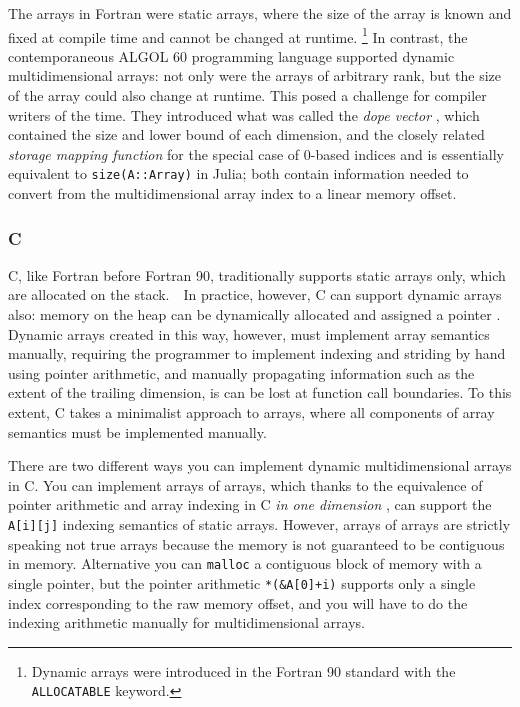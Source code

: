 \documentclass[preprint]{sigplanconf}
\newcommand{\ALGOL}{A\textsc{LGOL}}
\newcommand{\code}[1]{\texttt{#1}}
\begin{document}
The arrays in Fortran were static arrays, where the size of the array is known
and fixed at compile time and cannot be changed at runtime. \footnote{Dynamic
arrays were introduced in the Fortran 90 standard with the \code{ALLOCATABLE}
keyword.} In contrast, the contemporaneous \ALGOL{} 60 programming language
supported dynamic multidimensional arrays: not only were the arrays of
arbitrary rank, but the size of the array could also change at runtime. This
posed a challenge for compiler writers of the time. They introduced what was
called the \textit{dope vector} \cite{Sattley:1960as, Sattley:1961as}, which
contained the size and lower bound of each dimension, and the closely related
\textit{storage mapping function} \cite[pp.~80--87]{Randell:1964a6} for the
special case of 0-based indices and is essentially equivalent to
\code{size(A::Array)} in Julia; both contain information needed to convert
from the multidimensional array index to a linear memory offset.

\subsubsection{C}

C, like Fortran before Fortran 90, traditionally supports static arrays only,
which are allocated on the stack.　In practice, however, C can support dynamic
arrays also: memory on the heap can be dynamically allocated and assigned a
pointer \cite{Kernigham:1978cp}. Dynamic arrays created in this way, however,
must implement array semantics manually, requiring the programmer to implement
indexing and striding by hand using pointer arithmetic, and manually
propagating information such as the extent of the trailing dimension, is can
be lost at function call boundaries. To this extent, C takes a minimalist
approach to arrays, where all components of array semantics must be
implemented manually.

There are two different ways you can implement dynamic multidimensional arrays
in C. You can implement arrays of arrays, which thanks to the equivalence of
pointer arithmetic and array indexing in C \textit{in one dimension}
\cite[pp.~93--96]{Kernigham:1978cp}, can support the \code{A[i][j]} indexing
semantics of static arrays. However, arrays of arrays are strictly speaking
not true arrays because the memory is not guaranteed to be contiguous in
memory. Alternative you can \code{malloc} a contiguous block of memory with a
single pointer, but the pointer arithmetic \code{*(\&A[0]+i)} supports only a
single index corresponding to the raw memory offset, and you will have to do
the indexing arithmetic manually for multidimensional arrays.
\end{document}
